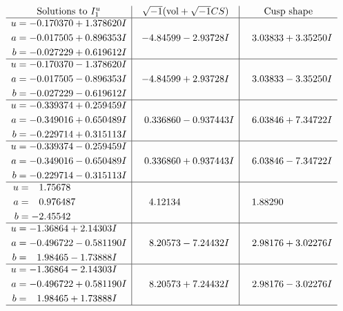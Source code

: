 \documentclass[1p]{elsarticle_modified}
\theoremstyle{definition}
\newcommand{\I}{\sqrt{-1}}
\begin{document}
$$\begin{array}{c|c|c}  
\text{Solutions to }I^u_{1}& \I (\text{vol} + \sqrt{-1}CS) & \text{Cusp shape}\\
 \hline 
\begin{aligned}
u &= -0.170370 + 1.378620 I \\
a &= -0.017505 + 0.896353 I \\
b &= -0.027229 + 0.619612 I\end{aligned}
 & -4.84599 - 2.93728 I & \phantom{-}3.03833 + 3.35250 I \\ \hline\begin{aligned}
u &= -0.170370 - 1.378620 I \\
a &= -0.017505 - 0.896353 I \\
b &= -0.027229 - 0.619612 I\end{aligned}
 & -4.84599 + 2.93728 I & \phantom{-}3.03833 - 3.35250 I \\ \hline\begin{aligned}
u &= -0.339374 + 0.259459 I \\
a &= -0.349016 + 0.650489 I \\
b &= -0.229714 + 0.315113 I\end{aligned}
 & \phantom{-}0.336860 - 0.937443 I & \phantom{-}6.03846 + 7.34722 I \\ \hline\begin{aligned}
u &= -0.339374 - 0.259459 I \\
a &= -0.349016 - 0.650489 I \\
b &= -0.229714 - 0.315113 I\end{aligned}
 & \phantom{-}0.336860 + 0.937443 I & \phantom{-}6.03846 - 7.34722 I \\ \hline\begin{aligned}
u &= \phantom{-}1.75678\phantom{ +0.000000I} \\
a &= \phantom{-}0.976487\phantom{ +0.000000I} \\
b &= -2.45542\phantom{ +0.000000I}\end{aligned}
 & \phantom{-}4.12134\phantom{ +0.000000I} & \phantom{-}1.88290\phantom{ +0.000000I} \\ \hline\begin{aligned}
u &= -1.36864 + 2.14303 I \\
a &= -0.496722 - 0.581190 I \\
b &= \phantom{-}1.98465 - 1.73888 I\end{aligned}
 & \phantom{-}8.20573 - 7.24432 I & \phantom{-}2.98176 + 3.02276 I \\ \hline\begin{aligned}
u &= -1.36864 - 2.14303 I \\
a &= -0.496722 + 0.581190 I \\
b &= \phantom{-}1.98465 + 1.73888 I\end{aligned}
 & \phantom{-}8.20573 + 7.24432 I & \phantom{-}2.98176 - 3.02276 I\\
 \hline 
 \end{array}$$\newpage\newpage\renewcommand{\arraystretch}{1}
\end{document}
